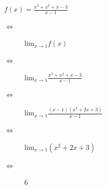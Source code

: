 \documentclass{article}
\begin{document}
\begin{description}
    \item $f(x) = \frac{x^3 + x^2 + x - 3}{x-1}$ 
    \begin{description}
        \item[$\Leftrightarrow$]lim$_{x\rightarrow1} f(x)$ 
        \item[$\Leftrightarrow$] lim$_{x\rightarrow1} \frac{x^3 + x^2 + x - 3}{x-1}$ 
        \item[$\Leftrightarrow$] lim$_{x\rightarrow1} \frac{(x-1)(x^2+2x+3)}{x-1}$ 
        \item[$\Leftrightarrow$] lim$_{x\rightarrow1} (x^2+2x+3)$ 
        \item[$\Leftrightarrow$] 6
    \end{description}
\end{description}
\end{document}
